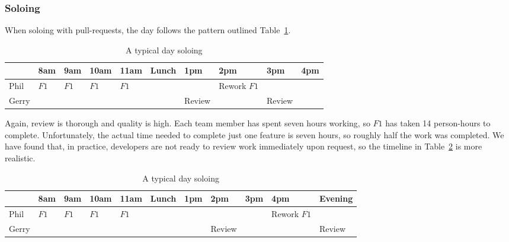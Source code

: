 \documentclass[letterpaper]{article}
\theoremstyle{definition}
\begin{document}
    \subsubsection{Soloing}\label{subsubsec:serial-soloing}

    When soloing with pull-requests, the day follows the pattern outlined Table~\ref{tab:serial-solo}.

    \begin{table}[h]
        \centering
        \tiny
        \begin{tabular}{ |l|l|l|l|l|l|l|l|l|l| }
            \hline
            & 8am  & 9am  & 10am & 11am & Lunch & 1pm    & 2pm         & 3pm    & 4pm \\
            \hline
            Phil  & $F1$ & $F1$ & $F1$ & $F1$ &       &        & Rework $F1$ &        &     \\
            \hline
            Gerry &      &      &      &      &       & Review &             & Review &     \\
            \hline
        \end{tabular}
        \caption{A typical day soloing}
        \label{tab:serial-solo}
    \end{table}

    Again, review is thorough and quality is high.
    Each team member has spent seven hours working, so $F1$ has taken 14 person-hours to complete.
    Unfortunately, the actual time needed to complete just one feature is seven hours, so roughly half the work was
    completed.
    We have found that, in practice, developers are not ready to review work immediately upon request,
    so the timeline in Table~\ref{tab:serial-solo-realistic} is more realistic.

    \begin{table}[h]
        \centering
        \tiny
        \begin{tabular}{ |l|l|l|l|l|l|l|l|l|l|l| }
            \hline
            & 8am  & 9am  & 10am & 11am & Lunch & 1pm & 2pm    & 3pm & 4pm         & Evening \\
            \hline
            Phil  & $F1$ & $F1$ & $F1$ & $F1$ &       &     &        &     & Rework $F1$ &         \\
            \hline
            Gerry &      &      &      &      &       &     & Review &     &             & Review  \\
            \hline
        \end{tabular}
        \caption{A typical day soloing}
        \label{tab:serial-solo-realistic}
    \end{table}
\end{document}
